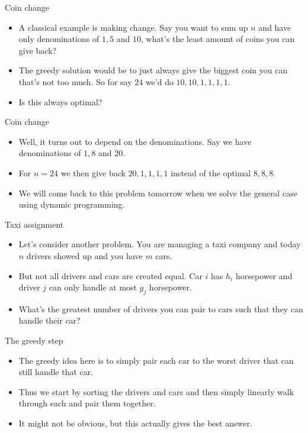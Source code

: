 \documentclass{beamer}
\begin{document}
\begin{frame}[plain]{Coin change}
    \begin{itemize}
        \item A classical example is making change. Say you want to sum up $n$ and have only denominations of $1, 5$ and $10$, what's the least amount of coins you can give back?
        \item The greedy solution would be to just always give the biggest coin you can that's not too much. So for say $24$ we'd do $10, 10, 1, 1, 1, 1$.
        \item Is this always optimal?
    \end{itemize}
\end{frame}

\begin{frame}[plain]{Coin change}
    \begin{itemize}
        \item Well, it turns out to depend on the denominations. Say we have denominations of $1, 8$ and $20$.
        \item For $n = 24$ we then give back $20, 1, 1, 1, 1$ instead of the optimal $8, 8, 8$.
        \item We will come back to this problem tomorrow when we solve the general case using dynamic programming.
    \end{itemize}
\end{frame}

\begin{frame}[plain]{Taxi assignment}
    \begin{itemize}
        \item Let's consider another problem. You are managing a taxi company and today $n$ drivers showed up and you have $m$ cars. 
        \item But not all drivers and cars are created equal. Car $i$ has $h_i$ horsepower and driver $j$ can only handle at most $g_j$ horsepower.
        \item What's the greatest number of drivers you can pair to cars such that they can handle their car?
    \end{itemize}
\end{frame}

\begin{frame}[plain]{The greedy step}
    \begin{itemize}
        \item The greedy idea here is to simply pair each car to the worst driver that can still handle that car.
        \item Thus we start by sorting the drivers and cars and then simply linearly walk through each and pair them together.
        \item It might not be obvious, but this actually gives the best answer.
    \end{itemize}
\end{frame}
\end{document}
